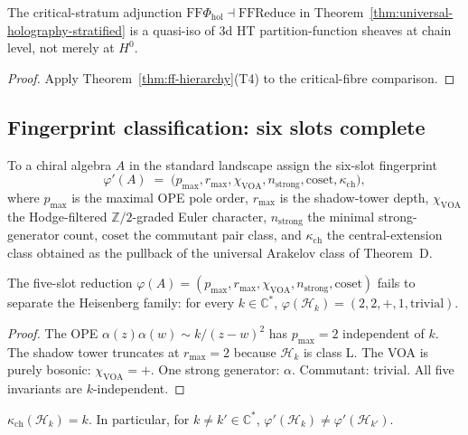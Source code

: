 \documentclass[11pt]{article}
\begin{document}
\begin{corollary}
The critical-stratum adjunction $\mathrm{FF}\Phi_{\mathrm{hol}}
\dashv \mathrm{FF}\mathrm{Reduce}$ in
Theorem~\ref{thm:universal-holography-stratified} is a quasi-iso
of $3$d HT partition-function sheaves at chain level, not merely
at $H^0$.
\end{corollary}

\begin{proof}
Apply Theorem~\ref{thm:ff-hierarchy}(T4) to the critical-fibre
comparison.
\end{proof}

\subsection{Fingerprint classification: six slots complete}
\label{subsec:fingerprint-six-slot}

To a chiral algebra $A$ in the standard landscape assign the
six-slot fingerprint
\[
  \varphi'(A)
  \;=\;
  \bigl(p_{\max}, r_{\max}, \chi_{\mathrm{VOA}},
        n_{\mathrm{strong}}, \mathrm{coset},
        \kappa_{\mathrm{ch}}\bigr),
\]
where $p_{\max}$ is the maximal OPE pole order, $r_{\max}$ is the
shadow-tower depth, $\chi_{\mathrm{VOA}}$ the Hodge-filtered
$\mathbb{Z}/2$-graded Euler character, $n_{\mathrm{strong}}$ the
minimal strong-generator count, $\mathrm{coset}$ the commutant pair
class, and $\kappa_{\mathrm{ch}}$ the central-extension class
obtained as the pullback of the universal Arakelov class of
Theorem~D.

\begin{proposition}
\label{prop:five-slot-insufficient}
The five-slot reduction $\varphi(A) = (p_{\max}, r_{\max},
\chi_{\mathrm{VOA}}, n_{\mathrm{strong}}, \mathrm{coset})$ fails
to separate the Heisenberg family: for every $k \in \mathbb{C}^*$,
$\varphi(\mathcal{H}_k) = (2, 2, +, 1, \mathrm{trivial})$.
\end{proposition}

\begin{proof}
The OPE $\alpha(z) \alpha(w) \sim k / (z-w)^2$ has $p_{\max} = 2$
independent of $k$. The shadow tower truncates at $r_{\max} = 2$
because $\mathcal{H}_k$ is class L. The VOA is purely bosonic:
$\chi_{\mathrm{VOA}} = +$. One strong generator: $\alpha$.
Commutant: trivial. All five invariants are $k$-independent.
\end{proof}

\begin{proposition}
\label{prop:six-slot-distinguishes}
$\kappa_{\mathrm{ch}}(\mathcal{H}_k) = k$. In particular, for
$k \ne k' \in \mathbb{C}^*$,
$\varphi'(\mathcal{H}_k) \ne \varphi'(\mathcal{H}_{k'})$.
\end{proposition}
\end{document}
